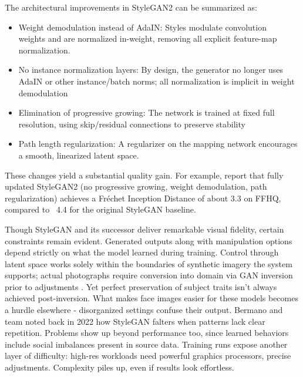 The architectural improvements in StyleGAN2 can be summarized as:

\begin{itemize}
    \item Weight demodulation instead of AdaIN: Styles modulate convolution \\weights and are normalized in-weight, removing all explicit feature-map normalization.
    \item No instance normalization layers: By design, the generator no longer uses AdaIN or other instance/batch norms; all normalization is implicit in weight demodulation
    \item Elimination of progressive growing: The network is trained at fixed full resolution, using skip/residual connections to preserve stability
    \item Path length regularization: A regularizer on the mapping network encourages a smooth, linearized latent space.
\end{itemize}

These changes yield a substantial quality gain. 
For example, \citet{karras2019stylebasedgeneratorarchitecturegenerative} report that fully updated StyleGAN2 
(no progressive growing, weight demodulation, path regularization) achieves a Fréchet Inception Distance of 
about 3.3 on FFHQ, compared to ~4.4 for the original StyleGAN baseline.

Though StyleGAN and its successor deliver remarkable visual fidelity, certain constraints remain evident. Generated outputs along with manipulation options depend strictly on what the model learned during training. Control through latent space works solely within the boundaries of synthetic imagery the system supports; actual photographs require conversion into domain via GAN inversion prior to adjustments \citep{bermano2022stateoftheartarchitecturemethodsapplications}. Yet perfect preservation of subject traits isn’t always achieved post-inversion. What makes face images easier for these models becomes a hurdle elsewhere - disorganized settings confuse their output. Bermano and team noted back in 2022 how StyleGAN falters when patterns lack clear repetition. Problems show up beyond performance too, since learned behaviors include social imbalances present in source data. Training runs expose another layer of difficulty: high-res workloads need powerful graphics processors, precise adjustments. Complexity piles up, even if results look effortless.
